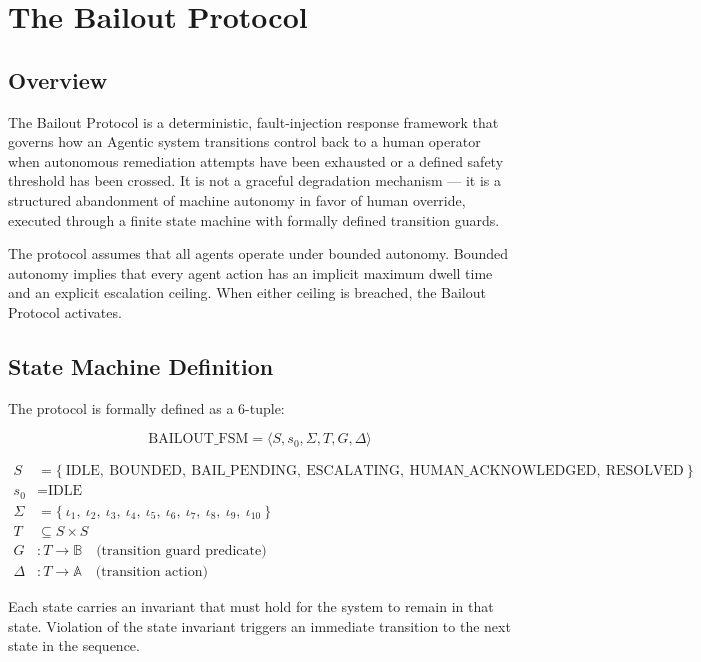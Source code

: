 \section{The Bailout Protocol}

\subsection{Overview}
The Bailout Protocol is a deterministic, fault-injection response framework that governs how an Agentic system transitions control back to a human operator when autonomous remediation attempts have been exhausted or a defined safety threshold has been crossed. It is not a graceful degradation mechanism — it is a structured abandonment of machine autonomy in favor of human override, executed through a finite state machine with formally defined transition guards.

The protocol assumes that all agents operate under bounded autonomy. Bounded autonomy implies that every agent action has an implicit maximum dwell time and an explicit escalation ceiling. When either ceiling is breached, the Bailout Protocol activates.

\subsection{State Machine Definition}

\label{state-machine}
The protocol is formally defined as a 6-tuple:

\[
\text{BAILOUT\_FSM} = \langle S, s_0, \Sigma, T, G, \Delta \rangle
\]

\begin{align*}
S &= \{\ \text{IDLE},\ \text{BOUNDED},\ \text{BAIL\_PENDING},\ \text{ESCALATING},\ \text{HUMAN\_ACKNOWLEDGED},\ \text{RESOLVED}\ \}\\
s_0 &= \text{IDLE} \\
\Sigma &= \{\ \iota_1,\ \iota_2,\ \iota_3,\ \iota_4,\ \iota_5,\ \iota_6,\ \iota_7,\ \iota_8,\ \iota_9,\ \iota_{10}\ \}\\
T &\subseteq S \times S \\
G &: T \rightarrow \mathbb{B} \quad \text{(transition guard predicate)}\\
\Delta &: T \rightarrow \mathbb{A} \quad \text{(transition action)}
\end{align*}

Each state carries an invariant that must hold for the system to remain in that state. Violation of the state invariant triggers an immediate transition to the next state in the sequence.


